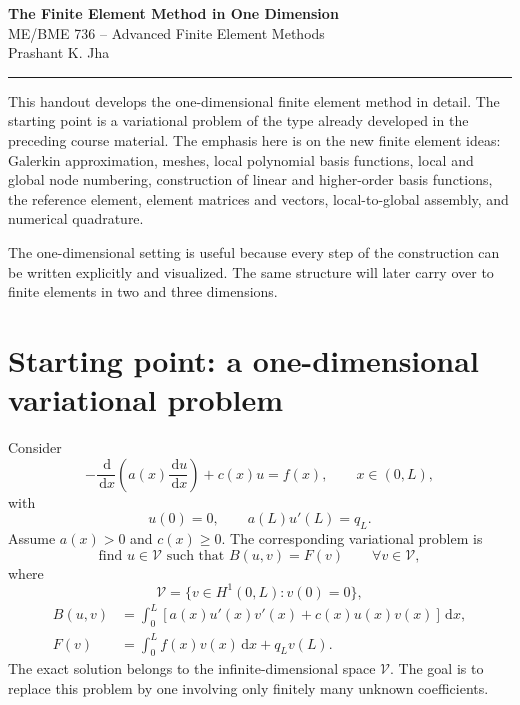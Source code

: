 \documentclass[11pt]{article}
\newcommand{\dd}{\,\mathrm{d}}
\newcommand{\V}{\mathcal{V}}
\begin{document}
\begin{center}
{\Large\bfseries The Finite Element Method in One Dimension}\\[4pt]
{\large ME/BME 736 -- Advanced Finite Element Methods}\\[2pt]
{\normalsize Prashant K. Jha}
\end{center}

\hrule
\vspace{0.8em}

This handout develops the one-dimensional finite element method in detail. The
starting point is a variational problem of the type already developed in the
preceding course material. The emphasis here is on the new finite element
ideas: Galerkin approximation, meshes, local polynomial basis functions,
local and global node numbering, construction of linear and higher-order
basis functions, the reference element, element matrices and vectors,
local-to-global assembly, and numerical quadrature.

The one-dimensional setting is useful because every step of the construction
can be written explicitly and visualized. The same structure will later carry
over to finite elements in two and three dimensions.

\section{Starting point: a one-dimensional variational problem}

Consider
\begin{equation}
-\frac{\dd}{\dd x}\left(a(x)\frac{\dd u}{\dd x}\right)
+c(x)u=f(x),\qquad x\in(0,L),
\label{eq:strong}
\end{equation}
with
\[
u(0)=0,
\qquad
a(L)u'(L)=q_L.
\]
Assume $a(x)>0$ and $c(x)\geq0$. The corresponding variational problem is
\begin{equation}
\boxed{
\text{find }u\in\V\text{ such that }
B(u,v)=F(v)\qquad\forall v\in\V,
}
\label{eq:weak}
\end{equation}
where
\[
\V=\{v\in H^1(0,L):v(0)=0\},
\]
\begin{align}
B(u,v)
&=\int_0^L\left[a(x)u'(x)v'(x)+c(x)u(x)v(x)\right]\dd x,
\label{eq:B}\\
F(v)
&=\int_0^L f(x)v(x)\dd x+q_Lv(L).
\label{eq:F}
\end{align}
The exact solution belongs to the infinite-dimensional space $\V$. The goal
is to replace this problem by one involving only finitely many unknown
coefficients.
\end{document}
